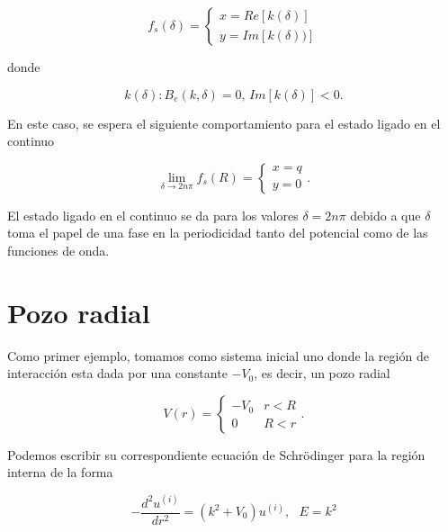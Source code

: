 \begin{equation*}
f_s(\delta) =
\begin{cases}
x = Re[k(\delta)]
\\
y = Im[k(\delta))]
\end{cases}
\end{equation*}

donde

\begin{equation*}
k(\delta): B_e(k,\delta) = 0, \, Im[k(\delta)] < 0.
\end{equation*}

En este caso, se espera el siguiente comportamiento para el estado ligado en el continuo

\begin{equation*}
\lim_{\delta \to 2 n \pi} f_s(R) = 
\begin{cases}
x = q
\\
y = 0
\end{cases}.
\end{equation*}

El estado ligado en el continuo se da para los valores $\delta = 2 n \pi$ debido a que $\delta$ toma el papel de una fase en la periodicidad tanto del potencial como de las funciones de onda.

\section{Pozo radial}

Como primer ejemplo, tomamos como sistema inicial uno donde la región de interacción esta dada por una constante $-V_0$, es decir, un pozo radial

\begin{equation*}
	V(r) = 
	\begin{cases}
	-V_0 & r < R
	\\
	0 & R < r
	\end{cases}.
\end{equation*}

Podemos escribir su correspondiente ecuación de Schrödinger para la región interna de la forma

\begin{equation*}
	-\frac{d^2 u^{(i)}}{dr^2} = (k^2 + V_0)u^{(i)}, \,\,\,\, E=k^2 
\end{equation*}

